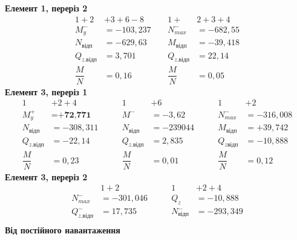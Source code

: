 \documentclass[a4paper,14pt]{article}
\begin{document}
\begin{enumerate}
    \textbf{Елемент 1, переріз 2}
    \begin{equation*}
        \begin{aligned}
        1+2&+3+6-8\qquad  &1+&2+3+4\\
        M^-_y &= -103,237 &N^-_{max} &= -682,55 \\
        N_\textit{відп} &= -629,63  &M_\textit{відп} &= -39,418\\
        Q_\textit{z.відп} &= 3,701 &Q_\textit{z.відп} &= 22,14 \\
        \dfrac{M}{N}&=0,16  &\dfrac{M}{N}&=0,05  
        \end{aligned}
    \end{equation*}
        \textbf{Елемент 3, переріз 1}
        \begin{equation*}
        \begin{aligned}
        1&+2+4  &1&+6 &1&+2\\
        M^+_y &= \textbf{+72,771} &M^- &= -3,62 &N^-_{max} &= -316,008\\
        N_\textit{відп} &= -308,311\qquad  &N_\textit{відп} &= -239044\qquad &M_\textit{відп} &= +39,742 \\
        Q_\textit{z.відп} &= -22,14 &Q_\textit{z.відп} &= 2,835 &Q_\textit{zвідп} &= -10,888 \\
        \dfrac{M}{N}&=0,23  &\dfrac{M}{N}&=0,01 &\dfrac{M}{N}&=0,12
        \end{aligned}
        \end{equation*}
        \textbf{Елемент 3, переріз 2}
        \begin{equation*}
        \begin{aligned}
        &1+2  &1&+2+4\\
        N^-_{max} &= -301,046\qquad &Q_z &= -10,888 \\
        Q^-_\textit{z.відп} &= 17,735 &N^-_\textit{відп} &= -293,349 \\
        \end{aligned}
        \end{equation*}
        \newpage
        \textbf{Від постійного навантаження}


\end{enumerate}
\end{document}
